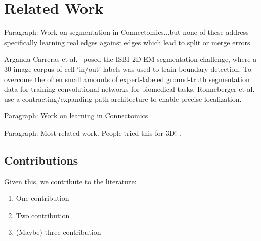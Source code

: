 \section{Related Work}

Paragraph: Work on segmentation in Connectomics...but none of these address specifically learning real edges against edges which lead to split or merge errors.

Arganda-Carreras et al.~\cite{10.3389/fnana.2015.00142} posed the ISBI 2D EM segmentation challenge, where a 30-image corpus of cell `in/out' labels was used to train boundary detection. To overcome the often small amounts of expert-labeled ground-truth segmentation data for training convolutional networks for biomedical tasks, Ronneberger et al.~\cite{RonnebergerFB15} use a contracting/expanding path architecture to enable precise localization.



Paragraph: Work on learning in Connectomics

Paragraph: Most related work. People tried this for 3D! \cite{BogovicHJ13}.

\subsection{Contributions}

Given this, we contribute to the literature:
\begin{enumerate}
\item One contribution
\item Two contribution
\item (Maybe) three contribution
\end{enumerate}